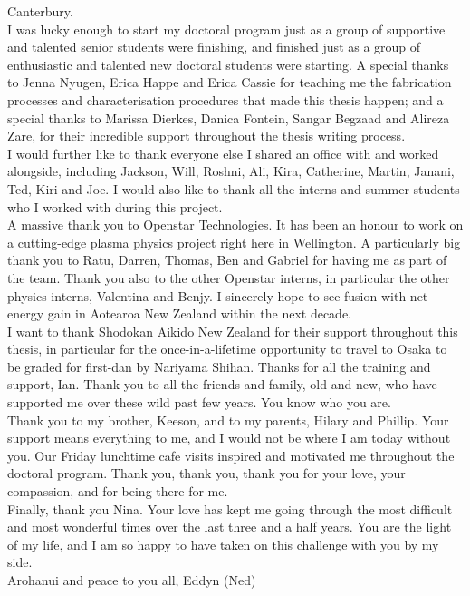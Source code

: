 \documentclass[
  a4paper,
]{scrbook}
\begin{document}
Canterbury. \\[5pt] I was lucky enough to start my doctoral program just as a group of supportive and talented senior students were finishing, and finished just as a group of enthusiastic and talented new doctoral students were starting. A special thanks to Jenna Nyugen, Erica Happe and Erica Cassie for teaching me the fabrication processes and characterisation procedures that made this thesis happen; and a special thanks to Marissa Dierkes, Danica Fontein, Sangar Begzaad and Alireza Zare, for their incredible support throughout the thesis writing process. \\[5pt] I would further like to thank everyone else I shared an office with and worked alongside, including Jackson, Will, Roshni, Ali, Kira, Catherine, Martin, Janani, Ted, Kiri and Joe. I would also like to thank all the interns and summer students who I worked with during this project. \\[5pt] A massive thank you to Openstar Technologies. It has been an honour to work on a cutting-edge plasma physics project right here in Wellington. A particularly big thank you to Ratu, Darren, Thomas, Ben and Gabriel for having me as part of the team. Thank you also to the other Openstar interns, in particular the other physics interns, Valentina and Benjy. I sincerely hope to see fusion with net energy gain in Aotearoa New Zealand within the next decade. \\[5pt] I want to thank Shodokan Aikido New Zealand for their support throughout this thesis, in particular for the once-in-a-lifetime opportunity to travel to Osaka to be graded for first-dan by Nariyama Shihan. Thanks for all the training and support, Ian. Thank you to all the friends and family, old and new, who have supported me over these wild past few years. You know who you are. \\[5pt] Thank you to my brother, Keeson, and to my parents, Hilary and Phillip. Your support means everything to me, and I would not be where I am today without you. Our Friday lunchtime cafe visits inspired and motivated me throughout the doctoral program. Thank you, thank you, thank you for your love, your compassion, and for being there for me. \\[5pt] Finally, thank you Nina. Your love has kept me going through the most difficult and most wonderful times over the last three and a half years. You are the light of my life, and I am so happy to have taken on this challenge with you by my side. \\[5pt] Arohanui and peace to you all, Eddyn (Ned)
\end{document}
